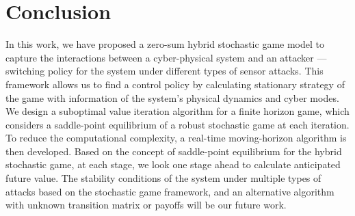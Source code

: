 \section{Conclusion}
\label{sec:concl}
In this work, we have proposed a zero-sum hybrid stochastic game model to capture the interactions between a cyber-physical system and an attacker --- switching policy for the system under different types of sensor attacks. This framework allows us to find a control policy by calculating stationary strategy of the game with information of the system's physical dynamics and cyber modes. We design a suboptimal value iteration algorithm for a finite horizon game, which considers a saddle-point equilibrium of a robust stochastic game at each iteration. To reduce the computational complexity, a real-time moving-horizon algorithm is then developed. Based on the concept of saddle-point equilibrium for the hybrid stochastic game, at each stage, we look one stage ahead to calculate anticipated future value. The stability conditions of the system under multiple types of attacks based on the stochastic game framework, and an alternative algorithm with unknown transition matrix or payoffs will be our future work.
